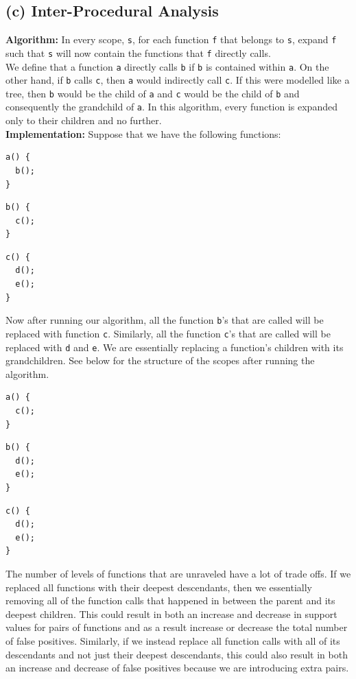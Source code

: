 \documentclass{article}
\begin{document}
\subsection*{(c) Inter-Procedural Analysis}
\textbf{Algorithm:} In every scope, \verb|s|, for each function \verb|f| that belongs to \verb|s|, expand \verb|f| such that \verb|s| will now contain the functions that \verb|f| directly calls. \\

We define that a function \verb|a| directly calls \verb|b| if \verb|b| is contained within \verb|a|. On the other hand, if \verb|b| calls \verb|c|, then \verb|a| would indirectly call \verb|c|. If this were modelled like a tree, then \verb|b| would be the child of \verb|a| and \verb|c| would be the child of \verb|b| and consequently the grandchild of \verb|a|. In this algorithm, every function is expanded only to their children and no further.
\\
\textbf{Implementation:} Suppose that we have the following functions:

\begin{lstlisting}
a() {
  b();
}
\end{lstlisting}

\begin{lstlisting}
b() {
  c();
}
\end{lstlisting}

\begin{lstlisting}
c() {
  d();
  e();
}
\end{lstlisting}

Now after running our algorithm, all the function \verb|b|'s that are called will be replaced with function \verb|c|. Similarly, all the function \verb|c|'s that are called will be replaced with \verb|d| and \verb|e|. We are essentially replacing a function's children with its grandchildren. See below for the structure of the scopes after running the algorithm.

\begin{lstlisting}
a() {
  c();
}
\end{lstlisting}

\begin{lstlisting}
b() {
  d();
  e();
}
\end{lstlisting}

\begin{lstlisting}
c() {
  d();
  e();
}
\end{lstlisting}

The number of levels of functions that are unraveled have a lot of trade offs. If we replaced all functions with their deepest descendants, then we essentially removing all of the function calls that happened in between the parent and its deepest children. This could result in both an increase and decrease in support values for pairs of functions and as a result increase or decrease the total number of false positives. Similarly, if we instead replace all function calls with all of its descendants and not just their deepest descendants, this could also result in both an increase and decrease of false positives because we are introducing extra pairs. \\
\end{document}
